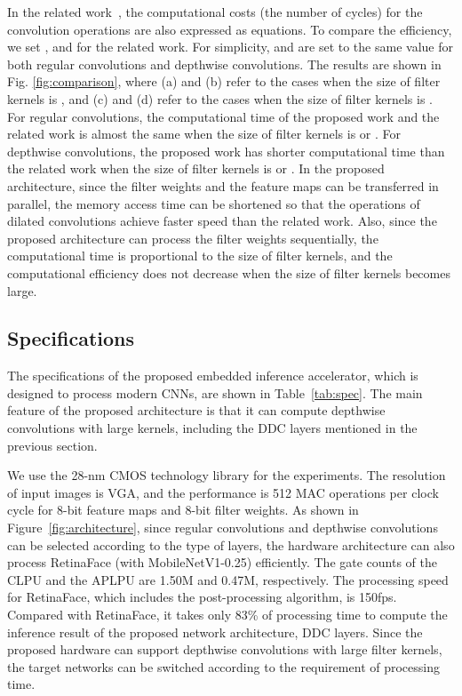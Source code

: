 \documentclass[runningheads]{llncs}
\begin{document}
In the related work~\cite{Yu20}, the computational costs (the number of cycles) for the convolution operations are also expressed as equations. To compare the efficiency, we set , and  for the related work. For simplicity,  and  are set to the same value for both regular convolutions and depthwise convolutions. The results are shown in Fig. \ref{fig:comparison}, where (a) and (b) refer to the cases when the size of filter kernels is , and (c) and (d) refer to the cases when the size of filter kernels is . For regular convolutions, the computational time of the proposed work and the related work is almost the same when the size of filter kernels is  or . For depthwise convolutions, the proposed work has shorter computational time than the related work when the size of filter kernels is  or . In the proposed architecture, since the filter weights and the feature maps can be transferred in parallel, the memory access time can be shortened so that the operations of dilated convolutions achieve faster speed than the related work. Also, since the proposed architecture can process the filter weights sequentially, the computational time is proportional to the size of filter kernels, and the computational efficiency does not decrease when the size of filter kernels becomes large.

\subsection{Specifications}
\label{subsec:specs}

The specifications of the proposed embedded inference accelerator, which is designed to process modern CNNs, are shown in Table~\ref{tab:spec}. The main feature of the proposed architecture is that it can compute depthwise convolutions with large kernels, including the DDC layers mentioned in the previous section.

We use the 28-nm CMOS technology library for the experiments. The resolution of input images is VGA, and the performance is 512 MAC operations per clock cycle for 8-bit feature maps and 8-bit filter weights. As shown in Figure~\ref{fig:architecture}, since regular convolutions and depthwise convolutions can be selected according to the type of layers, the hardware architecture can also process RetinaFace (with MobileNetV1-0.25) efficiently. The gate counts of the CLPU and the APLPU are 1.50M and 0.47M, respectively. The processing speed for RetinaFace, which includes the post-processing algorithm, is 150fps. Compared with RetinaFace, it takes only 83\% of processing time to compute the inference result of the proposed network architecture, DDC layers. Since the proposed hardware can support depthwise convolutions with large filter kernels, the target networks can be switched according to the requirement of processing time.
\end{document}
